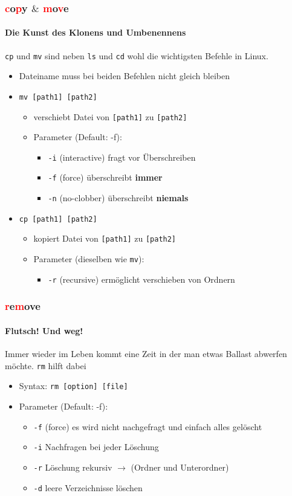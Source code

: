 \documentclass[12pt,utf8]{beamer}
\begin{document}
\begin{frame}
\frametitle{\textcolor{red}{c}o\textcolor{red}{p}y $\&$ \textcolor{red}{m}o\textcolor{red}{v}e}
\framesubtitle{\textcolor{ownDarkOr}{Die Kunst des Klonens und Umbenennens}}
\texttt{cp} und \texttt{mv} sind neben \texttt{ls} und \texttt{cd} wohl die wichtigsten Befehle in Linux.
\begin{itemize}
	\item Dateiname muss bei beiden Befehlen nicht gleich bleiben
	\item \texttt{mv [path1] [path2]}
	\begin{itemize}
		\item verschiebt Datei von \texttt{[path1]} zu \texttt{[path2]}
		\item Parameter (Default: -f):
		\begin{itemize}[<+->]
			\item {\scriptsize \texttt{-i} (interactive) fragt vor Überschreiben}
			\item {\scriptsize \texttt{-f} (force) überschreibt \textbf{immer}}
			\item {\scriptsize \texttt{-n} (no-clobber) überschreibt \textbf{niemals}}
		\end{itemize}
	\end{itemize}
	\item \texttt{cp [path1] [path2]}
	\begin{itemize}
		\item kopiert Datei von \texttt{[path1]} zu \texttt{[path2]}
		\item Parameter {\scriptsize (dieselben wie \texttt{mv})}:
		\begin{itemize}[<+->]
			\item {\scriptsize \texttt{-r} (recursive) ermöglicht verschieben von Ordnern}
		\end{itemize}
	\end{itemize}
\end{itemize}
\end{frame}

\begin{frame}
\frametitle{\textcolor{red}{r}e\textcolor{red}{m}ove}
\framesubtitle{\textcolor{ownDarkOr}{Flutsch! Und weg!}}
Immer wieder im Leben kommt eine Zeit in der man etwas Ballast abwerfen möchte.  
\texttt{rm} hilft dabei
\begin{itemize}
	\item Syntax: \texttt{rm [option] [file]}
	\item Parameter (Default: -f):
	\begin{itemize}[<+->]
		\item \texttt{-f} (force) es wird nicht nachgefragt und einfach alles gelöscht
		\item \texttt{-i} Nachfragen bei jeder Löschung
		\item \texttt{-r} Löschung rekursiv $\to$ (Ordner und Unterordner)
		\item \texttt{-d} leere Verzeichnisse löschen
	\end{itemize}
\end{itemize}
\end{frame}
\end{document}
